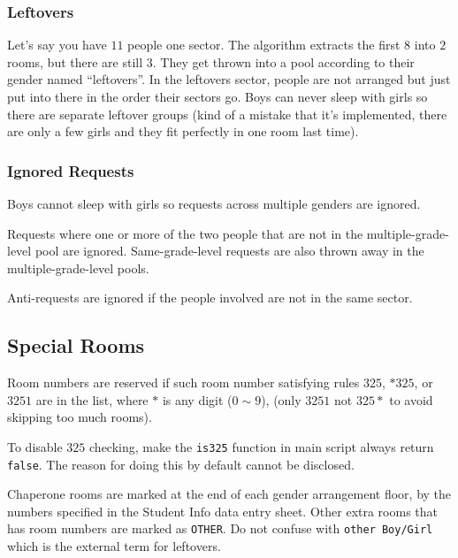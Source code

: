 \documentclass[openany,notitlepage]{book}
\begin{document}
	\subsubsection{Leftovers}  \label{lefto}
	
	Let's say you have $11$ people one sector. The algorithm extracts the first $8$ into $2$ rooms, but there are still $3$.
	They get thrown into a pool according to their gender named ``leftovers''. In the leftovers sector, people are not
	arranged but just put into there in the order their sectors go. Boys can never sleep with girls so there are separate
	leftover groups (kind of a mistake that it's implemented, there are only a few girls and they fit perfectly in one room
	last time).
	
	\subsubsection{Ignored Requests}
	Boys cannot sleep with girls so requests across multiple genders are ignored.
	
	Requests where one or more of the two people that are not in the multiple-grade-level pool are ignored.
	Same-grade-level requests are also thrown away in the multiple-grade-level pools.
	
	Anti-requests are ignored if the people involved are not in the same sector.
	
	\subsection{Special Rooms}\label{325}
	Room numbers are reserved if such room number satisfying rules $325$, $*325$, or $3251$ are in the list, where $*$ is any digit ($0\sim9$), (only $3251$ not $325*$ to avoid skipping too much rooms).
	
	To disable $325$ checking, make the \verb|is325| function in main script always return \verb|false|. The reason for doing this by default cannot be disclosed.
	
	Chaperone rooms are marked at the end of each gender arrangement floor, by the numbers specified in the Student
	Info data entry sheet. Other extra rooms that has room numbers are marked as \verb|OTHER|. Do not confuse with \verb|other Boy/Girl| which 
	is the external term for leftovers.
	
\end{document}
